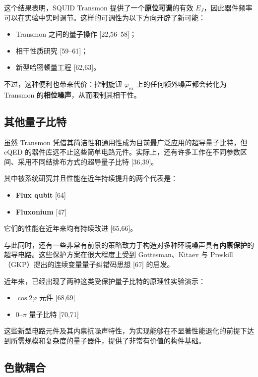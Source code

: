 \documentclass[12pt,a4paper,oneside]{ctexbook}
\begin{document}
这个结果表明，SQUID Transmon 提供了一个\textbf{原位可调}的有效 \(E_J\)，因此器件频率可以在实验中实时调节。这样的可调性为以下方向开辟了新可能：
\begin{itemize}[leftmargin=2em]
    \item Transmon 之间的量子操作 [22,56--58]；
    \item 相干性质研究 [59--61]；
    \item 新型哈密顿量工程 [62,63]。
\end{itemize}

不过，这种便利也带来代价：控制旋钮 \(\varphi_{\mathrm{ex}}\) 上的任何额外噪声都会转化为 Transmon 的\textbf{相位噪声}，从而限制其相干性。

\subsection{其他量子比特}

虽然 Transmon 凭借其简洁性和通用性成为目前最广泛应用的超导量子比特，但 cQED 的器件库远不止这些简单电路元件。实际上，还有许多工作在不同参数区间、采用不同结排布方式的超导量子比特 [36,39]。

其中被系统研究并且性能在近年持续提升的两个代表是：
\begin{itemize}[leftmargin=2em]
    \item \textbf{Flux qubit} [64]
    \item \textbf{Fluxonium} [47]
\end{itemize}
它们的性能在近年来均有持续改进 [65,66]。

与此同时，还有一些非常有前景的策略致力于构造对多种环境噪声具有\textbf{内禀保护}的超导电路。这些保护方案在很大程度上受到 Gottesman、Kitaev 与 Preskill（GKP）提出的连续变量量子纠错码思想 [67] 的启发。

近年来，已经出现了两种这类受保护量子比特的原理性实验演示：
\begin{itemize}[leftmargin=2em]
    \item \(\cos 2\varphi\) 元件 [68,69]
    \item \(0\text{--}\pi\) 量子比特 [70,71]
\end{itemize}

这些新型电路元件及其内禀抗噪声特性，为实现能够在不显著性能退化的前提下达到所需规模和复杂度的量子器件，提供了非常有价值的构件基础。

\subsection{色散耦合}
\end{document}
